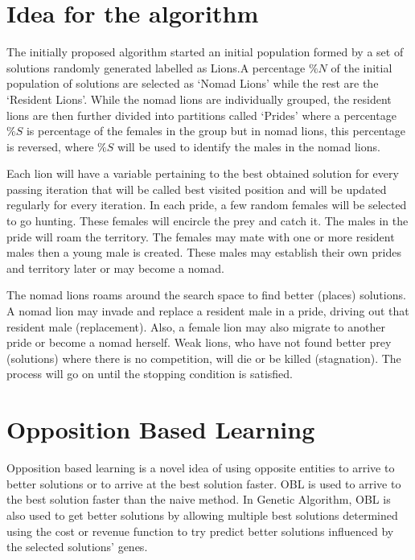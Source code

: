 \section{Idea for the algorithm}
\par The initially proposed algorithm started an initial population formed by a set of solutions randomly generated labelled as Lions.A percentage $\%N$ of the initial population of solutions are selected as `Nomad Lions' while the rest are the `Resident Lions'. While the nomad lions are individually grouped, the resident lions are then further divided into partitions called `Prides' where a percentage $\%S$ is percentage of the females in the group but in nomad lions, this percentage is reversed, where $\%S$ will be used to identify the males in the nomad lions.
\par Each lion will have a variable pertaining to the best obtained solution for every passing iteration that will be called best visited position and will be updated regularly for every iteration. In each pride, a few random females will be selected to go hunting. These females will encircle the prey and catch it. The males in the pride will roam the territory. The females may mate with one or more resident males then a young male is created. These males may establish their own prides and territory later or may become a nomad.
\par The nomad lions roams around the search space to find better (places) solutions. A nomad lion may invade and replace a resident male in a pride, driving out that resident male (replacement). Also, a female lion may also migrate to another pride or become a nomad herself. Weak lions, who have not found better prey (solutions) where there is no competition, will die or be killed (stagnation). The process will go on until the stopping condition is satisfied.

\section{Opposition Based Learning}
\par Opposition based learning is a novel idea of using opposite entities to arrive to better solutions or to arrive at the best solution faster. OBL is used to arrive to the best solution faster than the naive method. In Genetic Algorithm, OBL is also used to get better solutions by allowing multiple best solutions determined using the cost or revenue function to try predict better solutions influenced by the selected solutions' genes.\par

